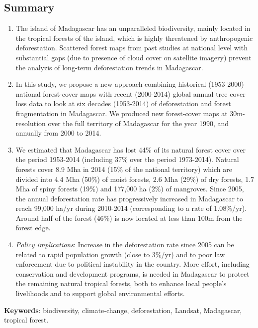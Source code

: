 \documentclass[]{article}
\begin{document}
\hypertarget{summary}{%
\subsection{Summary}\label{summary}}

\begin{enumerate}
\def\labelenumi{\arabic{enumi}.}
\item
  The island of Madagascar has an unparalleled biodiversity, mainly
  located in the tropical forests of the island, which is highly
  threatened by anthropogenic deforestation. Scattered forest maps from
  past studies at national level with substantial gaps (due to presence
  of cloud cover on satellite imagery) prevent the analyzis of long-term
  deforestation trends in Madagascar.
\item
  In this study, we propose a new approach combining historical
  (1953-2000) national forest-cover maps with recent (2000-2014) global
  annual tree cover loss data to look at six decades (1953-2014) of
  deforestation and forest fragmentation in Madagascar. We produced new
  forest-cover maps at 30m-resolution over the full territory of
  Madagascar for the year 1990, and annually from 2000 to 2014.
\item
  We estimated that Madagascar has lost 44\% of its natural forest cover
  over the period 1953-2014 (including 37\% over the period 1973-2014).
  Natural forests cover 8.9 Mha in 2014 (15\% of the national territory)
  which are divided into 4.4 Mha (50\%) of moist forests, 2.6 Mha (29\%)
  of dry forests, 1.7 Mha of spiny forests (19\%) and 177,000 ha (2\%)
  of mangroves. Since 2005, the annual deforestation rate has
  progressively increased in Madagascar to reach 99,000 ha/yr during
  2010-2014 (corresponding to a rate of 1.08\%/yr). Around half of the
  forest (46\%) is now located at less than 100m from the forest edge.
\item
  \emph{Policy implications}: Increase in the deforestation rate since
  2005 can be related to rapid population growth (close to 3\%/yr) and
  to poor law enforcement due to political instability in the country.
  More effort, including conservation and development programs, is
  needed in Madagascar to protect the remaining natural tropical
  forests, both to enhance local people's livelihoods and to support
  global environmental efforts.
\end{enumerate}

\textbf{Keywords}: biodiversity, climate-change, deforestation, Landsat,
Madagascar, tropical forest.
\end{document}
